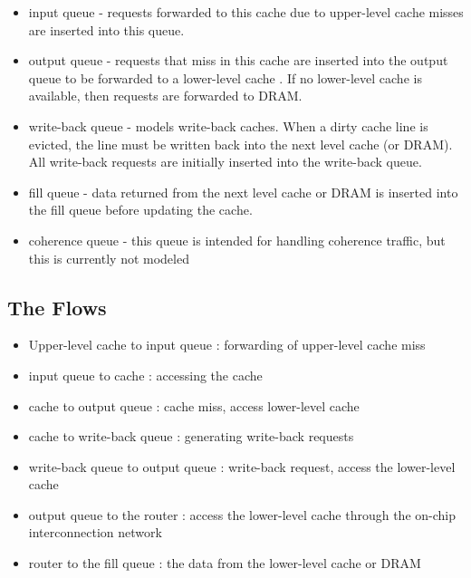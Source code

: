 \begin{itemize}
  \item input queue - requests forwarded to this cache due to upper-level cache misses are inserted into this queue.

  \item output queue - requests that miss in this cache are inserted into the
  output queue to be forwarded to a lower-level cache . If no lower-level cache
  is available, then requests are forwarded to DRAM.

  \item write-back queue - \SIM models write-back caches. When a dirty cache
  line is evicted, the line must be written back into the next level cache (or
      DRAM). All write-back requests are initially inserted into the write-back
  queue.

  \item fill queue - data returned from the next level cache or DRAM is
  inserted into the fill queue before updating the cache.

  \item coherence queue - this queue is intended for handling coherence
  traffic, but this is currently not modeled 
  
\end{itemize}


\subsection{The Flows}
\label{sec:cache-flow}

\begin{itemize}

  \item Upper-level cache to input queue : forwarding of upper-level cache miss 

  \item input queue to cache : accessing the cache

  \item cache to output queue : cache miss, access lower-level cache

  \item cache to write-back queue : generating write-back requests

  \item write-back queue to output queue : write-back request, access the
  lower-level cache

  \item output queue to the router : access the lower-level cache
  through the on-chip interconnection network

  \item router to the fill queue : the data from the lower-level cache
  or DRAM

\end{itemize}


